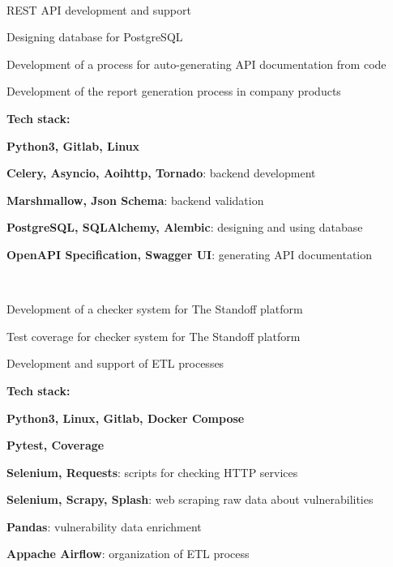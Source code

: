 \documentclass[a4paper]{MagicalCV}
\begin{document}
\hfill
\begin{minipage}[t]{0.66\textwidth} 


 \\
\vspace{\topsep} %
\begin{tightemize}
  \item REST API development and support
  \item Designing database for PostgreSQL
  \item Development of a process for auto-generating API documentation from code
  \item Development of the report generation process in company products
\end{tightemize}
\textbf{Tech stack:} 
\begin{tightemize}
  \item \textbf{Python3, Gitlab, Linux}
  \item \textbf{Celery, Asyncio, Aoihttp, Tornado}: backend development
  \item \textbf{Marshmallow, Json Schema}: backend validation
  \item \textbf{PostgreSQL, SQLAlchemy, Alembic}: designing and using database
  \item \textbf{OpenAPI Specification, Swagger UI}: generating API documentation
\end{tightemize}
\sectionsep

 \\
\vspace{\topsep} %
\begin{tightemize}
  \item Development of a checker system for The Standoff platform
  \item Test coverage for checker system for The Standoff platform
  \item Development and support of ETL processes
\end{tightemize}
\textbf{Tech stack:}
\begin{tightemize}
  \item \textbf{Python3, Linux, Gitlab, Docker Compose}
  \item \textbf{Pytest, Coverage}
  \item \textbf{Selenium, Requests}: scripts for checking HTTP services
  \item \textbf{Selenium, Scrapy, Splash}: web scraping raw data about vulnerabilities
  \item \textbf{Pandas}: vulnerability data enrichment
  \item \textbf{Appache Airflow}: organization of ETL process
\end{tightemize}
\sectionsep


\end{minipage} 
\end{document}
